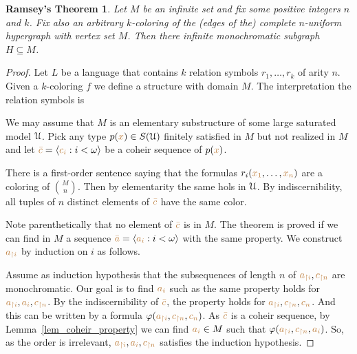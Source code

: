 \documentclass[creche.tex]{subfiles}
\begin{document}
\theoremstyle{mio}
\newtheorem{Ramsey}[thm]{Ramsey's Theorem}
\begin{Ramsey}\label{thm_Ramsey}
Let $M$ be an infinite set and fix some positive integers $n$ and $k$.
Fix also an arbitrary $k$-coloring of the (edges of the) complete $n$-uniform hypergraph with vertex set $M$.
Then there infinite monochromatic subgraph $H\subseteq M$.
\end{Ramsey}
\begin{proof}
Let $L$ be a language that contains $k$ relation symbols $r_1,\dots,r_k$ of arity $n$.
Given a $k$-coloring $f$ we define a structure with domain $M$.
The interpretation the relation symbols is




We may assume that $M$ is an elementary substructure of some large saturated model $\EuScript U$.
Pick any type $p({\color{brown} x})\in S(\EuScript U)$ finitely satisfied in $M$ but not realized in $M$ and let ${\color{brown}\bar c}=\langle{\color{brown}c_i}:i<\omega\rangle$ be a coheir sequence of $p({\color{brown} x})$.

There is a first-order sentence saying that the formulas $r_i({\color{brown} x_1},\dots,{\color{brown} x_n})$ are a coloring of ${M\choose n}$.
Then by elementarity the same hols in $\EuScript U$.
By indiscernibility,
all tuples of $n$ distinct elements of ${\color{brown}\bar c}$ have the same color.



Note parenthetically that no element of ${\color{brown}\bar c}$ is in $M$.
The theorem is proved if we can find in $M$ a sequence ${\color{brown}\bar a}=\langle{\color{brown}a_i}:i<\omega\rangle$ with the same property.
We construct ${\color{brown} a_{\restriction i}}$ by induction on $i$ as follows.


Assume as induction hypothesis that the subsequences of length $n$ of ${\color{brown} a_{\restriction i}},{\color{brown} c_{\restriction n}}$ are monochromatic.
Our goal is to find ${\color{brown} a_i}$ such as the same property holds for ${\color{brown} a_{\restriction i}},{\color{brown} a_i},{\color{brown} c_{\restriction n}}$.
By the indiscernibility of ${\color{brown}\bar c}$,
the property holds for  ${\color{brown} a_{\restriction i}},{\color{brown} c_{\restriction n}},{\color{brown}{c_n}}$.
 And this can be written by a formula $\varphi({\color{brown} a_{\restriction i}},{\color{brown} c_{\restriction n}},{\color{brown}{c_n}})$.
As ${\color{brown}\bar c}$ is a coheir sequence,
by Lemma~\ref{lem_coheir_property} we can find  ${\color{brown} a_i}\in M$ such that  $\varphi({\color{brown} a_{\restriction i}},{\color{brown} c_{\restriction n}},{\color{brown} a_i})$.
So,
as the order is irrelevant,
${\color{brown} a_{\restriction i}},{\color{brown} a_i},{\color{brown} c_{\restriction n}}$ satisfies the induction hypothesis.
\end{proof}
\end{document}
